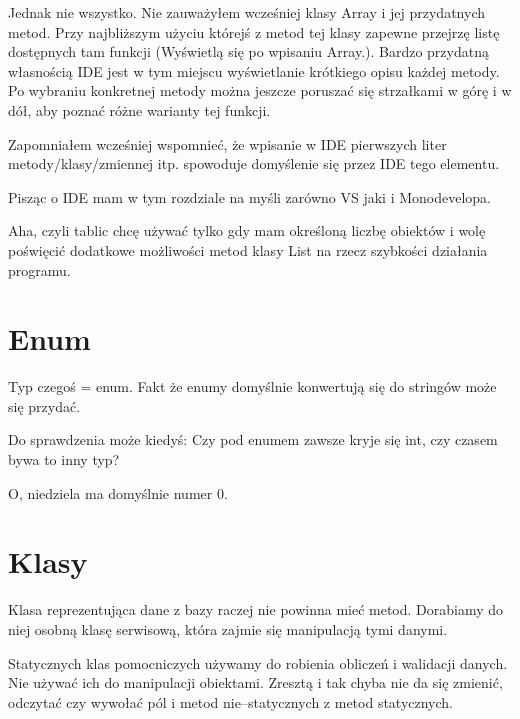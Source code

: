 \documentclass[10pt]{article}
\begin{document}
Jednak nie wszystko. Nie zauważyłem wcześniej klasy Array i jej przydatnych metod. Przy najbliższym użyciu którejś z metod tej klasy zapewne przejrzę listę dostępnych tam funkcji (Wyświetlą się po wpisaniu Array.). Bardzo przydatną własnością IDE jest w tym miejscu wyświetlanie krótkiego opisu każdej metody. Po wybraniu konkretnej metody można jeszcze poruszać się strzałkami w górę i w dół, aby poznać różne warianty tej funkcji.

Zapomniałem wcześniej wspomnieć, że wpisanie w IDE pierwszych liter metody/klasy/zmiennej itp. spowoduje domyślenie się przez IDE tego elementu.

Pisząc o IDE mam w tym rozdziale na myśli zarówno VS jaki i Monodevelopa.

Aha, czyli tablic chcę używać tylko gdy mam określoną liczbę obiektów i wolę poświęcić dodatkowe możliwości metod klasy List na rzecz szybkości działania programu.

\section{Enum}
Typ czegoś = enum. Fakt że enumy domyślnie konwertują się do stringów może się przydać.

Do sprawdzenia może kiedyś: Czy pod enumem zawsze kryje się int, czy czasem bywa to inny typ?

O, niedziela ma domyślnie numer 0.

\section{Klasy}
Klasa reprezentująca dane z bazy raczej nie powinna mieć metod. Dorabiamy do niej osobną klasę serwisową, która zajmie się manipulacją tymi danymi.

Statycznych klas pomocniczych używamy do robienia obliczeń i walidacji danych. Nie używać ich do manipulacji obiektami. Zresztą i tak chyba nie da się zmienić, odczytać czy wywołać pól i metod nie--statycznych z metod statycznych. 
\end{document}
